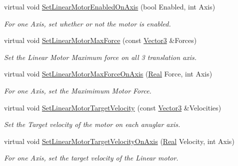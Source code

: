 \begin{DoxyCompactItemize}
virtual void \hyperlink{classMezzanine_1_1Generic6DofConstraint_a28b2398edd33f7af4043acce4d4e9893}{SetLinearMotorEnabledOnAxis} (bool Enabled, int Axis)
\begin{DoxyCompactList}\small\item\em For one Axis, set whether or not the motor is enabled. \item\end{DoxyCompactList}\item 
virtual void \hyperlink{classMezzanine_1_1Generic6DofConstraint_a9338ccdac5c4eaf9b561feb242c5f89e}{SetLinearMotorMaxForce} (const \hyperlink{classMezzanine_1_1Vector3}{Vector3} \&Forces)
\begin{DoxyCompactList}\small\item\em Set the Linear Motor Maximum force on all 3 translation axis. \item\end{DoxyCompactList}\item 
virtual void \hyperlink{classMezzanine_1_1Generic6DofConstraint_ab8286b0bb20cccc7c2810ad76c9d3ee5}{SetLinearMotorMaxForceOnAxis} (\hyperlink{namespaceMezzanine_a726731b1a7df72bf3583e4a97282c6f6}{Real} Force, int Axis)
\begin{DoxyCompactList}\small\item\em For one Axis, set the Maximimum Motor Force. \item\end{DoxyCompactList}\item 
virtual void \hyperlink{classMezzanine_1_1Generic6DofConstraint_a5458f6dc3b7b321a7323dcf4103737e8}{SetLinearMotorTargetVelocity} (const \hyperlink{classMezzanine_1_1Vector3}{Vector3} \&Velocities)
\begin{DoxyCompactList}\small\item\em Set the Target velocity of the motor on each anuglar axis. \item\end{DoxyCompactList}\item 
virtual void \hyperlink{classMezzanine_1_1Generic6DofConstraint_abc6bc013544b9793c17a929578115b32}{SetLinearMotorTargetVelocityOnAxis} (\hyperlink{namespaceMezzanine_a726731b1a7df72bf3583e4a97282c6f6}{Real} Velocity, int Axis)
\begin{DoxyCompactList}\small\item\em For one Axis, set the target velocity of the Linear motor. \item\end{DoxyCompactList}\item 

\end{DoxyCompactItemize}
